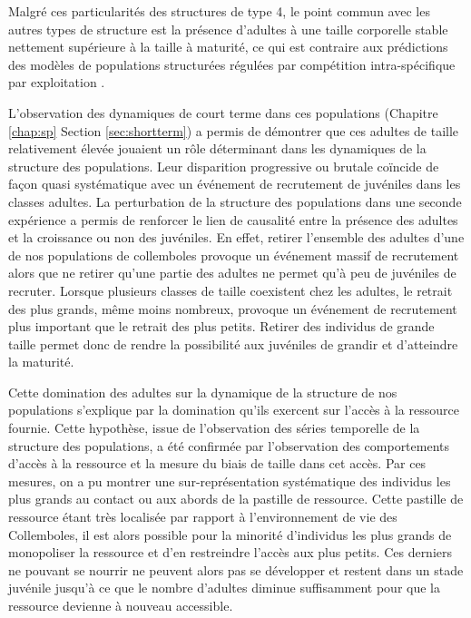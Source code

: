 Malgré ces particularités des structures de type 4, le point commun avec les
autres types de structure est la présence d'adultes à une taille corporelle
stable nettement supérieure à la taille à maturité, ce qui est contraire aux
prédictions des modèles de populations structurées régulées par compétition
intra-spécifique par exploitation
\autocites{kooijman1984a,de-roos1997a,de-roos2003a,de-roos2003b}.

L'observation des dynamiques de court terme dans ces populations (Chapitre
\ref{chap:sp} Section \ref{sec:shortterm}) a permis de démontrer que ces adultes
de taille relativement élevée jouaient un rôle déterminant dans les dynamiques
de la structure des populations. Leur disparition progressive ou brutale
coïncide de façon quasi systématique avec un événement de recrutement de
juvéniles dans les classes adultes. La perturbation de la structure des
populations dans une seconde expérience a permis de renforcer le lien de
causalité entre la présence des adultes et la croissance ou non des juvéniles.
En effet, retirer l'ensemble des adultes d'une de nos populations de collemboles
provoque un événement massif de recrutement alors que ne retirer qu'une partie
des adultes ne permet qu'à peu de juvéniles de recruter.
Lorsque plusieurs classes de taille coexistent chez les adultes, le retrait des
plus grands, même moins nombreux, provoque un événement de recrutement plus
important que le retrait des plus petits. Retirer des individus de grande taille
permet donc de rendre la possibilité aux juvéniles de grandir et d'atteindre la
maturité.

Cette domination des adultes sur la dynamique de la structure de nos populations
s'explique par la domination qu'ils exercent sur l'accès à la ressource fournie.
Cette hypothèse, issue de l'observation des séries temporelle de la structure
des populations, a été confirmée par l'observation des comportements d'accès à
la ressource et la mesure du biais de taille dans cet accès. Par ces mesures, on
a pu montrer une sur-représentation systématique des individus les plus grands
au contact ou aux abords de la pastille de ressource. Cette pastille de
ressource étant très localisée par rapport à l'environnement de vie des
Collemboles, il est alors possible pour la minorité d'individus les plus grands
de monopoliser la ressource et d'en restreindre l'accès aux plus petits. Ces
derniers ne pouvant se nourrir ne peuvent alors pas se développer et restent
dans un stade juvénile jusqu'à ce que le nombre d'adultes diminue suffisamment
pour que la ressource devienne à nouveau accessible.

